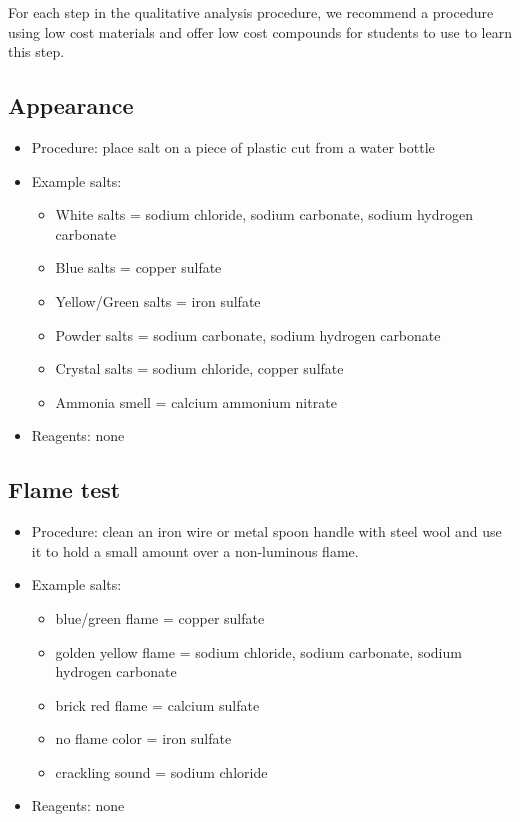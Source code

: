 For each step in the qualitative analysis procedure, 
we recommend a procedure using low cost materials 
and offer low cost compounds for students to use to learn this step.

\subsection{Appearance}
\begin{itemize}
\item{Procedure: place salt on a piece of plastic cut from a water bottle}
\item{Example salts:}
\begin{itemize}
\item{White salts = sodium chloride, 
sodium carbonate, 
sodium hydrogen carbonate}
\item{Blue salts = copper sulfate}
\item{Yellow/Green salts = iron sulfate}
\item{Powder salts = sodium carbonate, 
sodium hydrogen carbonate}
\item{Crystal salts = sodium chloride, 
copper sulfate}
\item{Ammonia smell = calcium ammonium nitrate}
\end{itemize}
\item{Reagents: none}
\end{itemize}

\subsection{Flame test}
\begin{itemize}
\item{Procedure: clean an iron wire or metal spoon handle 
with steel wool and use it to hold a small amount 
over a non-luminous flame.}
\item{Example salts:}
\begin{itemize}
\item{blue/green flame = copper sulfate}
\item{golden yellow flame = sodium chloride, 
sodium carbonate, 
sodium hydrogen carbonate}
\item{brick red flame = calcium sulfate}
\item{no flame color = iron sulfate}
\item{crackling sound = sodium chloride}
\end{itemize}
\item{Reagents: none}
\end{itemize}

